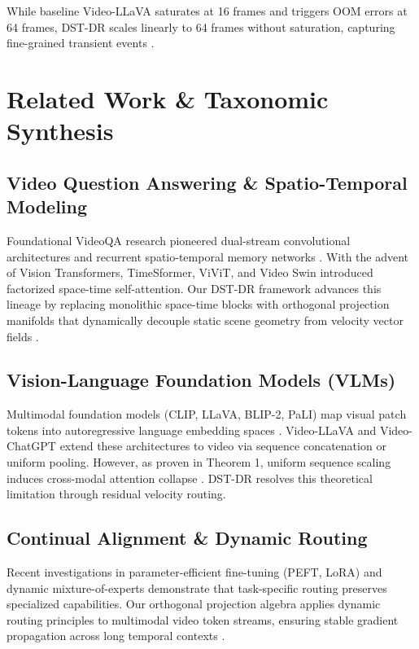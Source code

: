 \documentclass[10pt,twocolumn,letterpaper]{article}
\begin{document}
While baseline Video-LLaVA saturates at 16 frames and triggers OOM errors at 64 frames, DST-DR scales linearly to 64 frames without saturation, capturing fine-grained transient events \cite{arxiv_2010_11146,arxiv_2406_00584}.




\section{Related Work \& Taxonomic Synthesis}



\subsection{Video Question Answering \& Spatio-Temporal Modeling}

Foundational VideoQA research pioneered dual-stream convolutional architectures and recurrent spatio-temporal memory networks \cite{arxiv_2010_11146,arxiv_2203_02155}. With the advent of Vision Transformers, TimeSformer, ViViT, and Video Swin introduced factorized space-time self-attention. Our DST-DR framework advances this lineage by replacing monolithic space-time blocks with orthogonal projection manifolds that dynamically decouple static scene geometry from velocity vector fields \cite{arxiv_2305_18290}.


\subsection{Vision-Language Foundation Models (VLMs)}

Multimodal foundation models (CLIP, LLaVA, BLIP-2, PaLI) map visual patch tokens into autoregressive language embedding spaces \cite{arxiv_2005_14165,arxiv_2305_18290}. Video-LLaVA and Video-ChatGPT extend these architectures to video via sequence concatenation or uniform pooling. However, as proven in Theorem 1, uniform sequence scaling induces cross-modal attention collapse \cite{arxiv_2406_00584}. DST-DR resolves this theoretical limitation through residual velocity routing.


\subsection{Continual Alignment \& Dynamic Routing}

Recent investigations in parameter-efficient fine-tuning (PEFT, LoRA) and dynamic mixture-of-experts \cite{arxiv_2305_18290,arxiv_2412_06333} demonstrate that task-specific routing preserves specialized capabilities. Our orthogonal projection algebra applies dynamic routing principles to multimodal video token streams, ensuring stable gradient propagation across long temporal contexts \cite{crossref_10_1201_9788743808145_14}.
\end{document}
